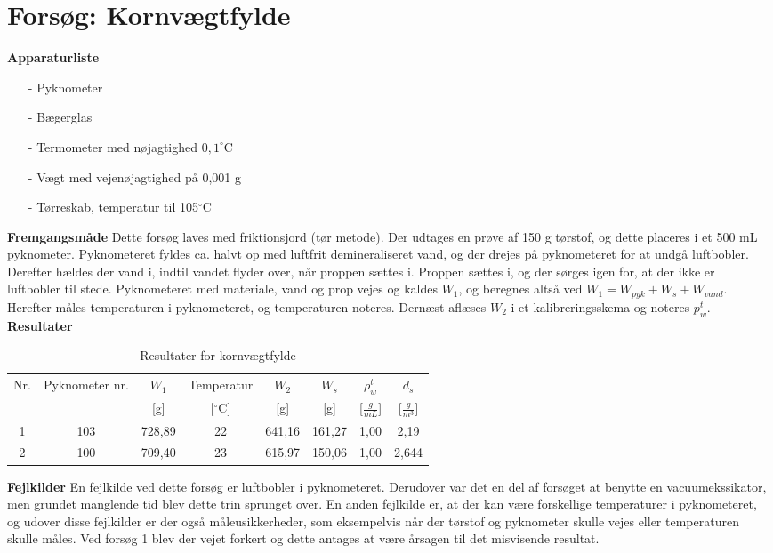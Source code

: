 \chapter{Forsøg: Kornvægtfylde}
\textbf{Apparaturliste}
\begin{itemize}
\item[-] Pyknometer
\item[-] Bægerglas
\item[-] Termometer med nøjagtighed $0,\!1^{\circ}$C
\item[-] Vægt med vejenøjagtighed på 0,001 g
\item[-] Tørreskab, temperatur til 105$^{\circ}$C
\end{itemize}

\textbf{Fremgangsmåde}
\newline
Dette forsøg laves med friktionsjord (tør metode). Der udtages en prøve af 150 g tørstof, og dette placeres i et 500 mL pyknometer. Pyknometeret fyldes ca. halvt op med luftfrit demineraliseret vand, og der drejes på pyknometeret for at undgå luftbobler. Derefter hældes der vand i, indtil vandet flyder over, når proppen sættes i. Proppen sættes i, og der sørges igen for, at der ikke er luftbobler til stede. Pyknometeret med materiale, vand og prop vejes og kaldes $W_{1}$, og beregnes altså ved $W_1 = W_{pyk} + W_s + W_{vand}$. Herefter måles temperaturen i pyknometeret, og temperaturen noteres. Dernæst aflæses $W_{2}$ i et kalibreringsskema og noteres $p_w^t$.
\newline
\newline
\textbf{Resultater}
\begin{table} [H]
\begin{center}
	\begin{tabular}{ c c c c c c c c } 
		\hline
		Nr. & Pyknometer nr. & $W_1$ & Temperatur & $W_2$ & $W_s$ & $\rho_{w}^t$ & $d_s$  \\
		&{\tiny } & [g] & [$^{\circ}$C] & [g] & [g] & [$\frac{g}{mL}$] & [$\frac{g}{m^3}$] \\ \hline
		1 & 103 & 728,89 & 22 & 641,16 & 161,27 & 1,00 & 2,19 \\
		2 & 100 & 709,40 & 23 & 615,97 & 150,06 & 1,00 & 2,644 \\
	\end{tabular}
	\caption{Resultater for kornvægtfylde}
	\label{tab:bilagc1}
\end{center}
\end{table}

\textbf{Fejlkilder}
\newline
En fejlkilde ved dette forsøg er luftbobler i pyknometeret. Derudover var det en del af forsøget at benytte en vacuumekssikator, men grundet manglende tid blev dette trin sprunget over. En anden fejlkilde er, at der kan være forskellige temperaturer i pyknometeret, og udover disse fejlkilder er der også måleusikkerheder, som eksempelvis når der tørstof og pyknometer skulle vejes eller temperaturen skulle måles. 
Ved forsøg 1 blev der vejet forkert og dette antages at være årsagen til det misvisende resultat.